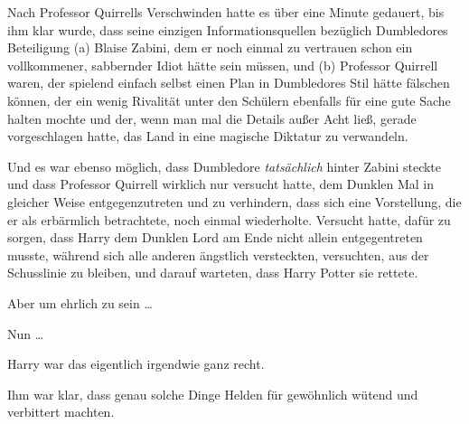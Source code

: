 Nach Professor Quirrells Verschwinden hatte es über eine Minute gedauert, bis ihm klar wurde, dass seine einzigen Informationsquellen bezüglich Dumbledores Beteiligung (a) Blaise Zabini, dem er noch einmal zu vertrauen schon ein vollkommener, sabbernder Idiot hätte sein müssen, und (b) Professor Quirrell waren, der spielend einfach selbst einen Plan in Dumbledores Stil hätte fälschen können, der ein wenig Rivalität unter den Schülern ebenfalls für eine gute Sache halten mochte und der, wenn man mal die Details außer Acht ließ, gerade vorgeschlagen hatte, das Land in eine magische Diktatur zu verwandeln.

Und es war ebenso möglich, dass Dumbledore \emph{tatsächlich} hinter Zabini steckte und dass Professor Quirrell wirklich nur versucht hatte, dem Dunklen Mal in gleicher Weise entgegenzutreten und zu verhindern, dass sich eine Vorstellung, die er als erbärmlich betrachtete, noch einmal wiederholte. Versucht hatte, dafür zu sorgen, dass Harry dem Dunklen Lord am Ende nicht allein entgegentreten musste, während sich alle anderen ängstlich versteckten, versuchten, aus der Schusslinie zu bleiben, und darauf warteten, dass Harry Potter sie rettete.

Aber um ehrlich zu sein …

Nun …

Harry war das eigentlich irgendwie ganz recht.

Ihm war klar, dass genau solche Dinge Helden für gewöhnlich wütend und verbittert machten.

